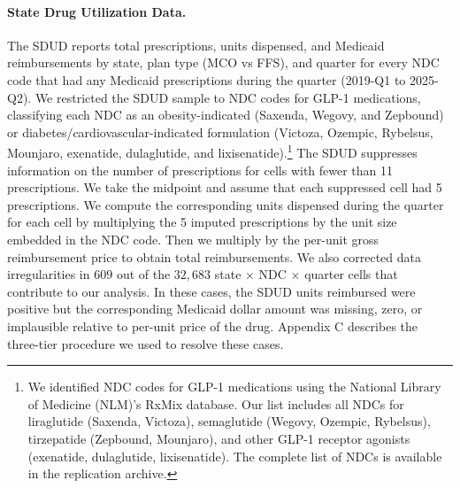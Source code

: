 \paragraph{State Drug Utilization Data.} The SDUD reports total prescriptions, units dispensed, and Medicaid reimbursements by state, plan type (MCO vs FFS), and quarter for every NDC code that had any Medicaid prescriptions during the quarter (2019-Q1 to 2025-Q2). We restricted the SDUD sample to NDC codes for GLP-1 medications, classifying each NDC as an obesity-indicated (Saxenda, Wegovy, and Zepbound) or diabetes/cardiovascular-indicated formulation (Victoza, Ozempic, Rybelsus, Mounjaro, exenatide, dulaglutide, and lixisenatide).\footnote{We identified NDC codes for GLP-1 medications using the National Library of Medicine (NLM)'s RxMix database. Our list includes all NDCs for liraglutide (Saxenda, Victoza), semaglutide (Wegovy, Ozempic, Rybelsus), tirzepatide (Zepbound, Mounjaro), and other GLP-1 receptor agonists (exenatide, dulaglutide, lixisenatide). The complete list of NDCs is available in the replication archive.} The SDUD suppresses information on the number of prescriptions for cells with fewer than 11 prescriptions. We take the midpoint and assume that each suppressed cell had 5 prescriptions. We compute the corresponding units dispensed during the quarter for each cell by multiplying the 5 imputed prescriptions by the unit size embedded in the NDC code. Then we multiply by the per-unit gross reimbursement price to obtain total reimbursements. We also corrected data irregularities in $609$ out of the $32{,}683$ state $\times$ NDC $\times$ quarter cells that contribute to our analysis. In these cases, the SDUD units reimbursed were positive but the corresponding Medicaid dollar amount was missing, zero, or implausible relative to per-unit price of the drug. Appendix C describes the three-tier procedure we used to resolve these cases.

